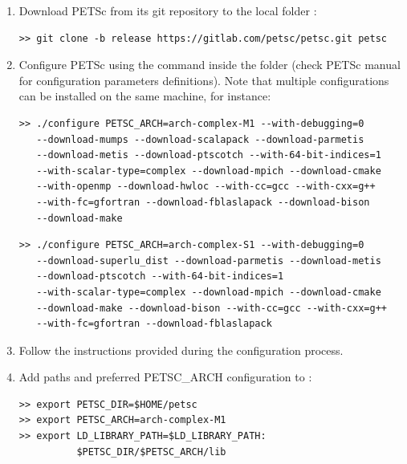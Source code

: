 \begin{enumerate}\itemsep0em 
\item Download PETSc from its git repository to the local folder : 
   
\begin{small}\begin{lstlisting}
>> git clone -b release https://gitlab.com/petsc/petsc.git petsc
\end{lstlisting}\end{small} 
     
\item Configure PETSc using the command  inside the folder  (check PETSc manual for configuration parameters definitions). Note that multiple configurations can be installed on the same machine, for instance:

\begin{small}\begin{lstlisting}
>> ./configure PETSC_ARCH=arch-complex-M1 --with-debugging=0 
   --download-mumps --download-scalapack --download-parmetis 
   --download-metis --download-ptscotch --with-64-bit-indices=1 
   --with-scalar-type=complex --download-mpich --download-cmake 
   --with-openmp --download-hwloc --with-cc=gcc --with-cxx=g++ 
   --with-fc=gfortran --download-fblaslapack --download-bison 
   --download-make
\end{lstlisting}\end{small}  	

\begin{small}\begin{lstlisting}
>> ./configure PETSC_ARCH=arch-complex-S1 --with-debugging=0 
   --download-superlu_dist --download-parmetis --download-metis 
   --download-ptscotch --with-64-bit-indices=1 
   --with-scalar-type=complex --download-mpich --download-cmake 
   --download-make --download-bison --with-cc=gcc --with-cxx=g++ 
   --with-fc=gfortran --download-fblaslapack 
\end{lstlisting}\end{small} 

\item Follow the instructions provided during the configuration process.
	
\item Add paths and preferred PETSC\_ARCH configuration to :

\begin{small}\begin{lstlisting}
>> export PETSC_DIR=$HOME/petsc
>> export PETSC_ARCH=arch-complex-M1
>> export LD_LIBRARY_PATH=$LD_LIBRARY_PATH:
          $PETSC_DIR/$PETSC_ARCH/lib 
\end{lstlisting}\end{small}  


\end{enumerate}
